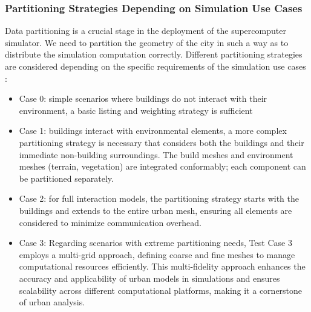 \documentclass[runningheads]{llncs}
\begin{document}
\subsubsection{Partitioning Strategies Depending on Simulation Use Cases}
Data partitioning is a crucial stage in the deployment of the supercomputer simulator. We need to partition the geometry of the city in such a way as to distribute the simulation computation correctly.
Different partitioning strategies are considered depending on the specific requirements of the simulation use cases :
\begin{itemize}
\item Case 0: simple scenarios where buildings do not interact with their environment, a basic listing and weighting strategy is sufficient
\item Case 1: buildings interact with environmental elements, a more complex partitioning strategy is necessary that considers both the buildings and their immediate non-building surroundings. The build meshes and environment meshes (terrain, vegetation) are integrated conformably; each component can be partitioned separately.
\item  Case 2: for full interaction models, the partitioning strategy starts with the buildings and extends to the entire urban mesh, ensuring all elements are considered to minimize communication overhead.
\item Case 3: Regarding scenarios with extreme partitioning needs, Test Case 3 employs a multi-grid approach, defining coarse and fine meshes to manage computational resources efficiently. This multi-fidelity approach enhances the accuracy and applicability of urban models in simulations and ensures scalability across different computational platforms, making it a cornerstone of urban analysis.
\end{itemize}
\end{document}
